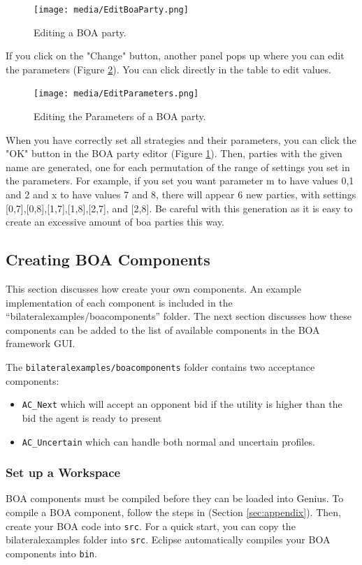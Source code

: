 \documentclass[]{article}
\begin{document}
\begin{figure}[!ht] 
	\center
	\texttt{[image: media/EditBoaParty.png]}
	\caption{Editing a BOA party.}
	\label{fig:editboaparty}
\end{figure}

If you click on the  "Change" button, another panel pops up where you can edit the parameters (Figure \ref{fig:editparameters}). You can click directly in the table to edit values.

\begin{figure}[!ht] 
	\center
	\texttt{[image: media/EditParameters.png]}
	\caption{Editing the Parameters of a BOA party.}
	\label{fig:editparameters}
\end{figure}

When you have correctly set all strategies and their parameters, you can click the "OK" button in the BOA party editor (Figure  \ref{fig:editboaparty}). Then, parties with the given name are generated, one for each permutation of the range of settings you set in the parameters. For example, if you set you want parameter m to have values 0,1 and 2 and x to have values 7 and 8, there will appear 6 new parties, with settings [0,7],[0,8],[1,7],[1,8],[2,7], and [2,8]. Be careful with this generation as it is easy to create an excessive amount of boa parties this way.


\subsection{Creating BOA Components} \label{sec:creating-boa-components}
This section discusses how create your own components. An example implementation of each component is included in the ``bilateralexamples/boacomponents'' folder. The next section discusses how these components can be added to the list of available components in the BOA framework GUI. 

The \verb|bilateralexamples/boacomponents| folder contains two acceptance components:
\begin{itemize}
\item \verb|AC_Next| which  will accept an opponent bid if the utility is higher than the bid the agent is ready to present
\item \verb|AC_Uncertain| which can handle both normal and uncertain profiles.
\end{itemize}

\subsubsection{Set up a Workspace}
BOA components must be compiled before they can be loaded into Genius.
To compile a BOA component, follow the steps in (Section \ref{sec:appendix}). Then, create your BOA code into \verb|src|. For a quick start, you can copy the bilateralexamples folder into \verb|src|. Eclipse automatically compiles your BOA components into \verb|bin|.
\end{document}
